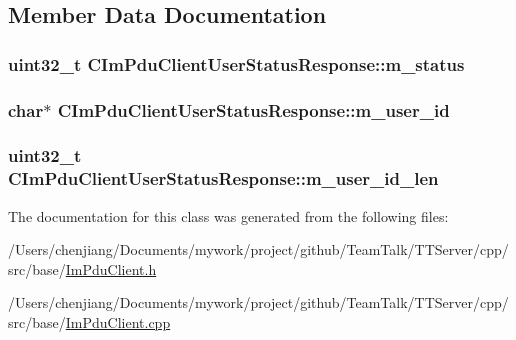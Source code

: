 \subsection{Member Data Documentation}
\hypertarget{class_c_im_pdu_client_user_status_response_a6db62bfaa02377300ac34dca13ffee10}{}
\subsubsection[{m\+\_\+status}]{\setlength{\rightskip}{0pt plus 5cm}uint32\+\_\+t C\+Im\+Pdu\+Client\+User\+Status\+Response\+::m\+\_\+status\hspace{0.3cm}{\ttfamily [private]}}\label{class_c_im_pdu_client_user_status_response_a6db62bfaa02377300ac34dca13ffee10}
\hypertarget{class_c_im_pdu_client_user_status_response_a73a8a18f90fd32259b4254e5b05b6fde}{}
\subsubsection[{m\+\_\+user\+\_\+id}]{\setlength{\rightskip}{0pt plus 5cm}char$\ast$ C\+Im\+Pdu\+Client\+User\+Status\+Response\+::m\+\_\+user\+\_\+id\hspace{0.3cm}{\ttfamily [private]}}\label{class_c_im_pdu_client_user_status_response_a73a8a18f90fd32259b4254e5b05b6fde}
\hypertarget{class_c_im_pdu_client_user_status_response_a8380b98d841e6770f795cef2a807f0ab}{}
\subsubsection[{m\+\_\+user\+\_\+id\+\_\+len}]{\setlength{\rightskip}{0pt plus 5cm}uint32\+\_\+t C\+Im\+Pdu\+Client\+User\+Status\+Response\+::m\+\_\+user\+\_\+id\+\_\+len\hspace{0.3cm}{\ttfamily [private]}}\label{class_c_im_pdu_client_user_status_response_a8380b98d841e6770f795cef2a807f0ab}


The documentation for this class was generated from the following files\+:\begin{DoxyCompactItemize}
\item 
/\+Users/chenjiang/\+Documents/mywork/project/github/\+Team\+Talk/\+T\+T\+Server/cpp/src/base/\hyperlink{_im_pdu_client_8h}{Im\+Pdu\+Client.\+h}\item 
/\+Users/chenjiang/\+Documents/mywork/project/github/\+Team\+Talk/\+T\+T\+Server/cpp/src/base/\hyperlink{_im_pdu_client_8cpp}{Im\+Pdu\+Client.\+cpp}\end{DoxyCompactItemize}
